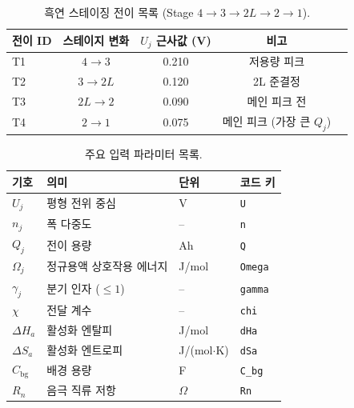 \documentclass[11pt,a4paper]{article}
\newcommand{\bg}{\mathrm{bg}}
\newcommand{\code}[1]{\texttt{#1}}
\begin{document}
\begin{table}[ht]
\centering
\caption{흑연 스테이징 전이 목록 (Stage $4\!\to\!3\!\to\!2L\!\to\!2\!\to\!1$).\label{tab:staging}}
\small
\begin{tabular}{@{}lcccc@{}}
\toprule
전이 ID & 스테이지 변화 & $U_j$ 근사값 (V) & 비고\\
\midrule
T1 & $4\!\to\!3$ & 0.210 & 저용량 피크\\
T2 & $3\!\to\!2L$ & 0.120 & 2L 준결정\\
T3 & $2L\!\to\!2$ & 0.090 & 메인 피크 전\\
T4 & $2\!\to\!1$ & 0.075 & 메인 피크 (가장 큰 $Q_j$)\\
\bottomrule
\end{tabular}
\end{table}

\begin{table}[ht]
\centering
\caption{주요 입력 파라미터 목록.\label{tab:inputs}}
\small
\begin{tabular}{@{}llll@{}}
\toprule
기호 & 의미 & 단위 & 코드 키\\
\midrule
$U_j$ & 평형 전위 중심 & V & \code{U}\\
$n_j$ & 폭 다중도 & -- & \code{n}\\
$Q_j$ & 전이 용량 & Ah & \code{Q}\\
$\Omega_j$ & 정규용액 상호작용 에너지 & J/mol & \code{Omega}\\
$\gamma_j$ & 분기 인자 ($\le1$) & -- & \code{gamma}\\
$\chi$ & 전달 계수 & -- & \code{chi}\\
$\Delta H_a$ & 활성화 엔탈피 & J/mol & \code{dHa}\\
$\Delta S_a$ & 활성화 엔트로피 & J/(mol$\cdot$K) & \code{dSa}\\
$C_\bg$ & 배경 용량 & F & \code{C\_bg}\\
$R_n$ & 음극 직류 저항 & $\Omega$ & \code{Rn}\\
\bottomrule
\end{tabular}
\end{table}
\end{document}
